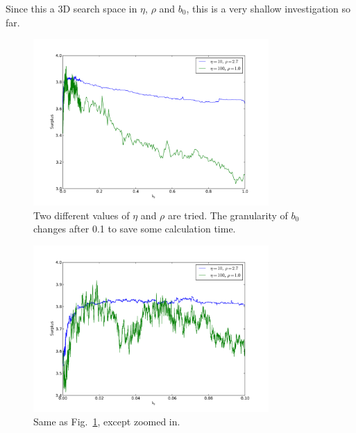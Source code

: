 \documentclass{article}
\begin{document}
Since this a 3D search space in $\eta$, $\rho$ and $b_0$, this is a very shallow investigation so far.

\begin{figure}
    \centering
    \includegraphics[width=0.8\textwidth]{figs/surplus45b.pdf}
    \caption{Two different values of $\eta$ and $\rho$ are tried. The granularity of $b_0$ changes after 0.1 to save some calculation time.} \label{fig:b0}
\end{figure}

\begin{figure}
    \centering
    \includegraphics[width=0.8\textwidth]{figs/surplus45.pdf}
    \caption{Same as Fig.~\ref{fig:b0}, except zoomed in.} \label{fig:b0zoom}
\end{figure}
\end{document}
